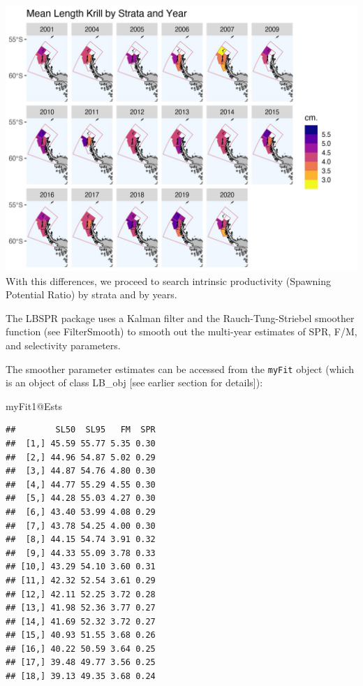 \documentclass[
]{article}
\newenvironment{Shaded}{\begin{snugshade}}{\end{snugshade}}
\newcommand{\NormalTok}[1]{#1}
\newcommand{\SpecialCharTok}[1]{\textcolor[rgb]{0.00,0.00,0.00}{#1}}
\begin{document}
\includegraphics{StrataLen.jpg} With this differences, we proceed to
search intrinsic productivity (Spawning Potential Ratio) by strata and
by years.

The LBSPR package uses a Kalman filter and the Rauch-Tung-Striebel
smoother function (see FilterSmooth) to smooth out the multi-year
estimates of SPR, F/M, and selectivity parameters.

The smoother parameter estimates can be accessed from the \texttt{myFit}
object (which is an object of class LB\_obj {[}see earlier section for
details{]}):

\begin{Shaded}
\begin{Highlighting}[]
\NormalTok{myFit1}\SpecialCharTok{@}\NormalTok{Ests}
\end{Highlighting}
\end{Shaded}

\begin{verbatim}
##        SL50  SL95   FM  SPR
##  [1,] 45.59 55.77 5.35 0.30
##  [2,] 44.96 54.87 5.02 0.29
##  [3,] 44.87 54.76 4.80 0.30
##  [4,] 44.77 55.29 4.55 0.30
##  [5,] 44.28 55.03 4.27 0.30
##  [6,] 43.40 53.99 4.08 0.29
##  [7,] 43.78 54.25 4.00 0.30
##  [8,] 44.15 54.74 3.91 0.32
##  [9,] 44.33 55.09 3.78 0.33
## [10,] 43.29 54.10 3.60 0.31
## [11,] 42.32 52.54 3.61 0.29
## [12,] 42.11 52.25 3.72 0.28
## [13,] 41.98 52.36 3.77 0.27
## [14,] 41.69 52.32 3.72 0.27
## [15,] 40.93 51.55 3.68 0.26
## [16,] 40.22 50.59 3.64 0.25
## [17,] 39.48 49.77 3.56 0.25
## [18,] 39.13 49.35 3.68 0.24
\end{verbatim}
\end{document}

